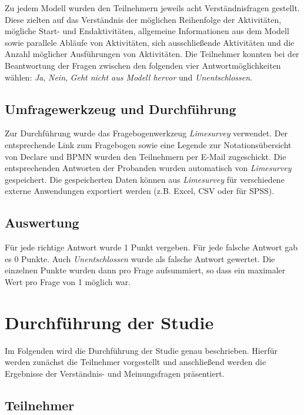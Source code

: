 Zu jedem Modell wurden den Teilnehmern jeweils acht Verständnisfragen gestellt. Diese zielten auf das Verständnis der möglichen Reihenfolge der Aktivitäten, mögliche Start- und Endaktivitäten, allgemeine Informationen aus dem Modell sowie parallele Abläufe von Aktivitäten, sich ausschließende Aktivitäten und die Anzahl möglicher Ausführungen von Aktivitäten.\newline
Die Teilnehmer konnten bei der Beantwortung der Fragen zwischen den folgenden vier Antwortmöglichkeiten wählen: \textit{Ja}, \textit{Nein}, \textit{Geht nicht aus Modell hervor} und \textit{Unentschlossen}.

\subsection{Umfragewerkzeug und Durchführung}

Zur Durchführung wurde das Fragebogenwerkzeug \textit{Limesurvey} verwendet. Der entsprechende Link zum Fragebogen sowie eine Legende zur Notationsübersicht von Declare und BPMN wurden den Teilnehmern per E-Mail zugeschickt. Die entsprechenden Antworten der Probanden wurden automatisch von \textit{Limesurvey} gespeichert. Die gespeicherten Daten können aus \textit{Limesurvey} für verschiedene externe Anwendungen exportiert werden (z.B. Excel, CSV oder für SPSS).

\subsection{Auswertung}

Für jede richtige Antwort wurde 1 Punkt vergeben. Für jede falsche Antwort gab es 0 Punkte. Auch \textit{Unentschlossen} wurde als falsche Antwort gewertet. Die einzelnen Punkte wurden dann pro Frage aufsummiert, so dass ein maximaler Wert pro Frage von 1 möglich war.

\section{Durchführung der Studie}

Im Folgenden wird die Durchführung der Studie genau beschrieben. Hierfür werden zunächst die Teilnehmer vorgestellt und anschließend werden die Ergebnisse der Verständnis- und Meinungsfragen präsentiert.

\subsection{Teilnehmer}

